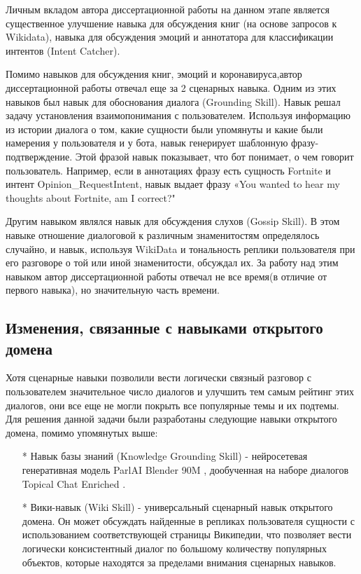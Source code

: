 Личным вкладом автора диссертационной работы на данном этапе является существенное улучшение навыка для обсуждения книг (на основе запросов к Wikidata), навыка для обсуждения эмоций и аннотатора для классификации интентов (Intent Catcher).

Помимо навыков для обсуждения книг, эмоций и коронавируса,автор диссертационной работы отвечал еще за 2 сценарных навыка.
Одним из этих навыков был навык для обоснования диалога (Grounding Skill). Навык решал задачу установления взаимопонимания с пользователем. Используя информацию из истории диалога о том, какие сущности были упомянуты и какие были намерения у пользователя и у бота, навык генерирует шаблонную фразу-подтверждение. Этой фразой навык показывает, что бот понимает, о чем говорит пользователь. Например, если в аннотациях фразу есть сущность Fortnite и интент Opinion\_RequestIntent, навык выдает фразу «You wanted to hear my thoughts about Fortnite, am I correct?"

Другим навыком являлся навык для обсуждения слухов (Gossip Skill). В этом навыке отношение диалоговой к различным знаменитостям определялось случайно, и навык, используя WikiData и тональность реплики пользователя при его разговоре о той или иной знаменитости, обсуждал их. За работу над этим навыком автор диссертационной работы отвечал не все время(в отличие от первого навыка), но значительную часть времени.

\subsection{Изменения, связанные с навыками открытого домена}

Хотя сценарные навыки позволили вести логически связный разговор с пользователем значительное число диалогов и улучшить тем самым рейтинг этих диалогов, они все еще не могли покрыть все популярные темы и их подтемы. Для решения данной задачи были разработаны следующие навыки открытого домена, помимо упомянутых выше:
\begin{itemize}
\item[*] Навык базы знаний (Knowledge Grounding Skill) - нейросетевая генеративная модель ParlAI Blender 90M \cite{roller_other_2020}, дообученная на наборе диалогов Topical Chat Enriched \cite{hedayatnia_2020}.
\item[*] Вики-навык (Wiki Skill) - универсальный сценарный навык открытого домена. Он может обсуждать найденные в репликах пользователя сущности с использованием соответствующей страницы Википедии, что позволяет вести логически консистентный диалог по большому количеству популярных объектов, которые находятся за пределами внимания сценарных навыков.
\end{itemize}
